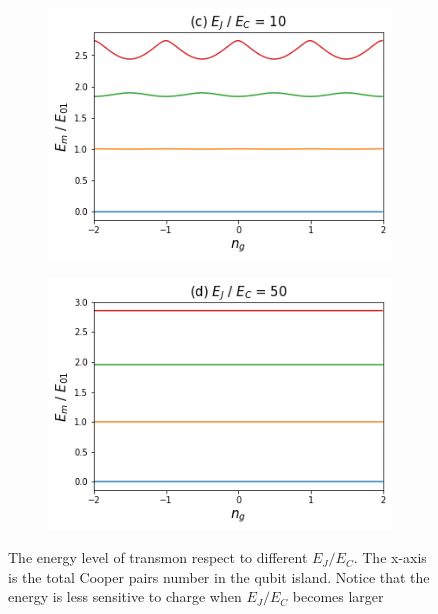 \begin{figure}[h!]
\begin{subfigure}[b]{0.48\textwidth}
         \centering \includegraphics[width=1\linewidth]{Pic/Transmon_elevel_10.png}
         \caption{}
         \label{fig:three sin x}
     \end{subfigure}
     \hfill
     \begin{subfigure}[b]{0.48\textwidth}
         \centering \includegraphics[width=1\linewidth]{Pic/Transmon_elevel_50.png}
         \caption{}
         \label{fig:three sin x}
     \end{subfigure}

    \caption{The energy level of transmon respect to different $E_J / E_C$. The x-axis is the total Cooper pairs number in the qubit island. Notice that the energy is less sensitive to charge when $E_J / E_C$ becomes larger}
    \label{Transmon_e}
\end{figure}

